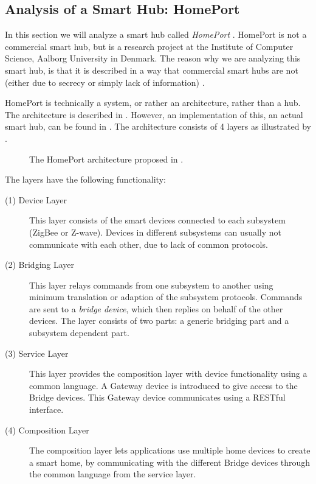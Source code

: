 \subsection{Analysis of a Smart Hub: HomePort}\label{sec:homeport}
In this section we will analyze a smart hub called \emph{HomePort} \cite{HOMEPORT10}.
HomePort is not a commercial smart hub, 
but is a research project at the Institute of Computer Science, Aalborg University in Denmark. 
The reason why we are analyzing this smart hub, 
is that it is described in a way that commercial smart hubs are not (either due to secrecy or simply lack of information) \cite{HOMEPORT09, HOMEPORT10, HOMEPORT13}.  

HomePort is technically a system, or rather an architecture, rather than a hub. 
The architecture is described in \cite{HOMEPORT10}. 
However, an implementation of this, \ie an actual smart hub, can be found in \cite{HOMEPORT13}. 
The architecture consists of \num{4} layers as illustrated by .

\begin{figure}[!htb]
    \centering
    
    \caption{The HomePort architecture proposed in \protect\cite{HOMEPORT10}.}
    \label{fig:homeport}
\end{figure}

The layers have the following functionality:
\begin{description}
    \item[(1) Device Layer] This layer consists of the smart devices connected to each subsystem (\eg ZigBee or Z-wave). Devices in different subsystems can usually not communicate with each other, due to lack of common protocols. 
    \item[(2) Bridging Layer] This layer relays commands from one subsystem to another using minimum translation or adaption of the subsystem protocols. Commands are sent to a \emph{bridge device}, which then replies on behalf of the other devices. The layer consists of two parts: a generic bridging part and a subsystem dependent part. 
    \item[(3) Service Layer] This layer provides the composition layer with device functionality using a common language. A Gateway device is introduced to give access to the Bridge devices. This Gateway device communicates using a RESTful interface. 
    \item[(4) Composition Layer] The composition layer lets applications use multiple home devices to create a smart home, by communicating with the different Bridge devices through the common language from the service layer. 
\end{description}

